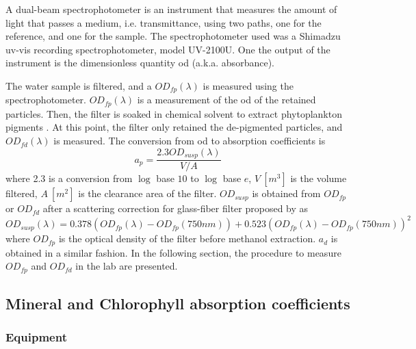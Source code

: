\begin{appendices}
A dual-beam spectrophotometer is an instrument that measures the amount of light that passes a medium, i.e. transmittance, using two paths, one for the reference, and one for the sample. The spectrophotometer used was a Shimadzu \gls{uv}-\gls{vis} recording spectrophotometer, model UV-2100U. One the output of the instrument is the dimensionless quantity \gls{od} (a.k.a. absorbance). 

The water sample is filtered, and a $OD_{fp}(\lambda)$ is measured using the spectrophotometer. $OD_{fp}(\lambda)$ is a measurement of the \gls{od} of the retained particles. Then, the filter is soaked in chemical solvent to extract phytoplankton pigments \cite{Kishino1985cj}. At this point, the filter only retained the de-pigmented particles, and $OD_{fd}(\lambda)$ is measured. The conversion from \gls{od} to absorption coefficients is \cite{Cleveland1993}
\begin{equation}
  a_p = \frac{\displaystyle 2.3 OD_{susp}(\lambda)}{V/A}
\end{equation}
\noindent where 2.3 is a conversion from $\log$ base $10$ to $\log$ base $e$, $V~[m^3]$ is the volume filtered, $A~[m^2]$ is the clearance area of the filter. $OD_{susp}$ is obtained from $OD_{fp}$ or $OD_{fd}$ after a scattering correction for glass-fiber filter proposed by \cite{Cleveland1993} as
\begin{equation}
   OD_{susp}(\lambda) = 0.378 (OD_{fp}(\lambda)-OD_{fp}(750nm)) + 0.523 (OD_{fp}(\lambda)-OD_{fp}(750nm))^2
 \end{equation} 
 \noindent where $OD_{fp}$ is the optical density of the filter before methanol extraction. $a_d$ is obtained in a similar fashion. In the following section, the procedure to measure $OD_{fp}$ and $OD_{fd}$ in the lab are presented.


\subsection{Mineral and Chlorophyll absorption coefficients}


\subsubsection{Equipment}

\end{appendices}
